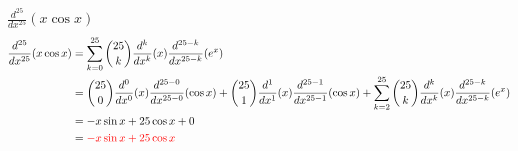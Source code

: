 \item [4.] $\displaystyle \frac{d^{25}}{dx^{25}} (x\cos{x})$
\begin{align*}
    \frac{d^{25}}{dx^{25}} (x\cos{x})
    &= \sum_{k=0}^{25} \binom{25}{k}
    \frac{d^{k}}{dx^{k}} (x)
    \frac{d^{25-k}}{dx^{25-k}} (e^x)\\
    &= 
    \binom{25}{0}
    \frac{d^{0}}{dx^{0}} (x)
    \frac{d^{25-0}}{dx^{25-0}} (\cos{x})
    +
    \binom{25}{1}
    \frac{d^{1}}{dx^{1}} (x)
    \frac{d^{25-1}}{dx^{25-1}} (\cos{x})
    +
    \sum_{k=2}^{25} \binom{25}{k}
    \frac{d^{k}}{dx^{k}} (x)
    \frac{d^{25-k}}{dx^{25-k}} (e^x)\\
    &= 
    -x\sin{x}
    +
    25\cos{x}
    +
    0\\
    &= \textcolor{red}{-x\sin{x} + 25\cos{x}}
\end{align*}